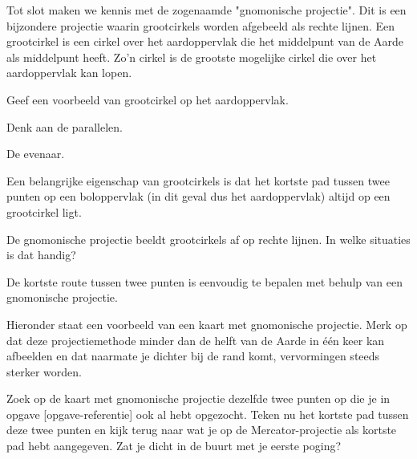 Tot slot maken we kennis met de zogenaamde "gnomonische projectie". Dit is een bijzondere projectie waarin grootcirkels worden afgebeeld als rechte lijnen. Een grootcirkel is een cirkel over het aardoppervlak die het middelpunt van de Aarde als middelpunt heeft. Zo'n cirkel is de grootste mogelijke cirkel die over het aardoppervlak kan lopen.

\begin{opgave}
	Geef een voorbeeld van grootcirkel op het aardoppervlak.
	\begin{hint}
		Denk aan de parallelen.
	\end{hint}
	\begin{antwoord}
		De evenaar.
	\end{antwoord}
\end{opgave}

Een belangrijke eigenschap van grootcirkels is dat het kortste pad tussen twee punten op een boloppervlak (in dit geval dus het aardoppervlak) altijd op een grootcirkel ligt.

\begin{opgave}
	De gnomonische projectie beeldt grootcirkels af op rechte lijnen. In welke situaties is dat handig?
	\begin{antwoord}
		De kortste route tussen twee punten is eenvoudig te bepalen met behulp van een gnomonische projectie.
	\end{antwoord}
\end{opgave}

Hieronder staat een voorbeeld van een kaart met gnomonische projectie. Merk op dat deze projectiemethode minder dan de helft van de Aarde in \'e\'en keer kan afbeelden en dat naarmate je dichter bij de rand komt, vervormingen steeds sterker worden.

\begin{opgave}
	Zoek op de kaart met gnomonische projectie dezelfde twee punten op die je in opgave [opgave-referentie] ook al hebt opgezocht. Teken nu het kortste pad tussen deze twee punten en kijk terug naar wat je op de Mercator-projectie als kortste pad hebt aangegeven. Zat je dicht in de buurt met je eerste poging?
\end{opgave}

